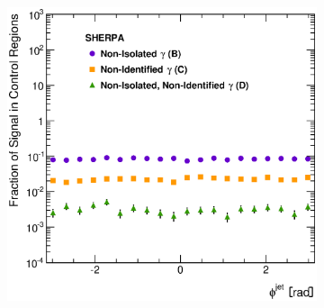 \documentclass[12pt, twoside]{article}
\numberwithin{equation}{section}
\numberwithin{figure}{section}
\newenvironment{changemargin}[2]{%
\begin{list}{}{%
\setlength{\topsep}{0pt}%
\setlength{\leftmargin}{#1}%
\setlength{\rightmargin}{#2}%
\setlength{\listparindent}{\parindent}%
\setlength{\itemindent}{\parindent}%
\setlength{\parsep}{\parskip}%
}%
\item[]}{\end{list}}
\begin{document}
\begin{figure}
\begin{changemargin}{-1.0cm}{-0.75cm}
\begin{changemargin}{-0.75cm}{-1.0cm}
\begin{subfigure}[b]{0.37\textwidth}
            \subcaption{}
            \label{fig:SLFRapidityJet}
        \end{subfigure}
        \begin{subfigure}[b]{0.37\textwidth}
            \includegraphics[width=\textwidth]{./images/SignalLeakageFractionsSherpa/SLF-106.eps}
            \subcaption{}
            \label{fig:SLFPhiJet}
        \end{subfigure}


\end{changemargin}
\end{changemargin}
\end{figure}
\end{document}
